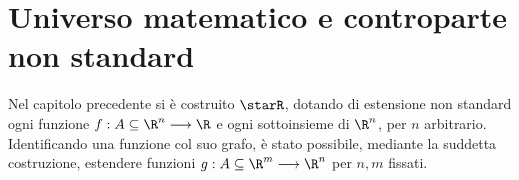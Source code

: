 \chapter{Universo matematico e controparte non standard}






Nel capitolo precedente si è costruito $ \starR $, dotando di estensione non standard ogni funzione $ f: A \subseteq \R^{n} \longrightarrow \R $ e ogni sottoinsieme di $ \R^{n} $, per $ n $ arbitrario. Identificando una funzione col suo grafo, è stato possibile, mediante la suddetta costruzione, estendere funzioni $ g: A \subseteq \R^{m} \longrightarrow \R^{n}$ per $ n, m $ fissati.

